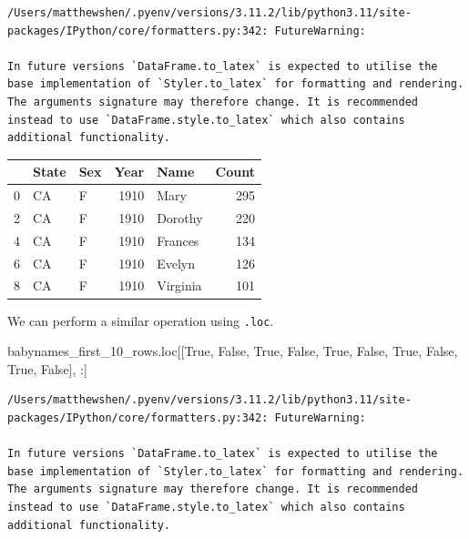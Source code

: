 \documentclass[
  letterpaper,
  DIV=11,
  numbers=noendperiod]{scrreprt}
\newenvironment{Shaded}{\begin{snugshade}}{\end{snugshade}}
\newcommand{\NormalTok}[1]{\textcolor[rgb]{0.00,0.23,0.31}{#1}}
\newcommand{\VariableTok}[1]{\textcolor[rgb]{0.07,0.07,0.07}{#1}}
\begin{document}
\begin{verbatim}
/Users/matthewshen/.pyenv/versions/3.11.2/lib/python3.11/site-packages/IPython/core/formatters.py:342: FutureWarning:

In future versions `DataFrame.to_latex` is expected to utilise the base implementation of `Styler.to_latex` for formatting and rendering. The arguments signature may therefore change. It is recommended instead to use `DataFrame.style.to_latex` which also contains additional functionality.
\end{verbatim}

\begin{tabular}{lllrlr}
\toprule
{} & State & Sex &  Year &      Name &  Count \\
\midrule
0 &    CA &   F &  1910 &      Mary &    295 \\
2 &    CA &   F &  1910 &   Dorothy &    220 \\
4 &    CA &   F &  1910 &   Frances &    134 \\
6 &    CA &   F &  1910 &    Evelyn &    126 \\
8 &    CA &   F &  1910 &  Virginia &    101 \\
\bottomrule
\end{tabular}

We can perform a similar operation using \texttt{.loc}.

\begin{Shaded}
\begin{Highlighting}[]
\NormalTok{babynames\_first\_10\_rows.loc[[}\VariableTok{True}\NormalTok{, }\VariableTok{False}\NormalTok{, }\VariableTok{True}\NormalTok{, }\VariableTok{False}\NormalTok{, }\VariableTok{True}\NormalTok{, }\VariableTok{False}\NormalTok{, }\VariableTok{True}\NormalTok{, }\VariableTok{False}\NormalTok{, }\VariableTok{True}\NormalTok{, }\VariableTok{False}\NormalTok{], :]}
\end{Highlighting}
\end{Shaded}

\begin{verbatim}
/Users/matthewshen/.pyenv/versions/3.11.2/lib/python3.11/site-packages/IPython/core/formatters.py:342: FutureWarning:

In future versions `DataFrame.to_latex` is expected to utilise the base implementation of `Styler.to_latex` for formatting and rendering. The arguments signature may therefore change. It is recommended instead to use `DataFrame.style.to_latex` which also contains additional functionality.
\end{verbatim}
\end{document}
